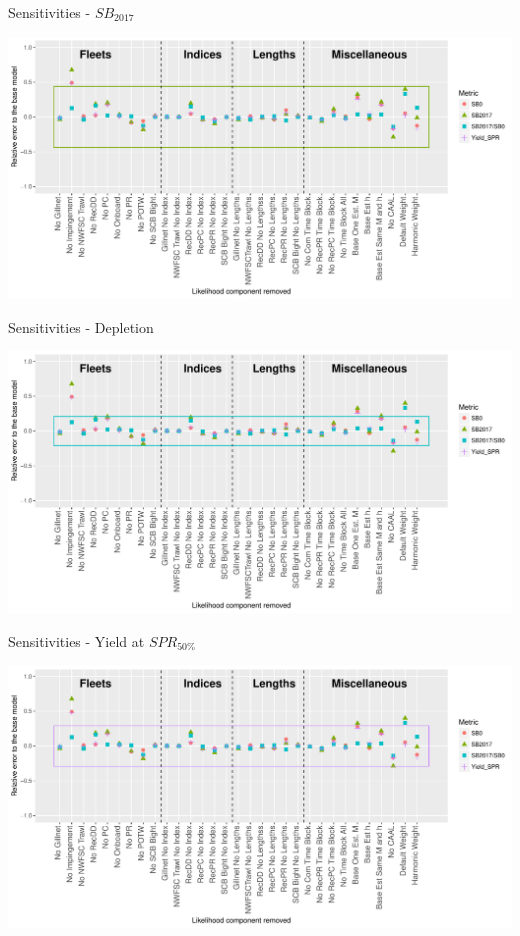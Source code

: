 \documentclass[ignorenonframetext,]{beamer}
\begin{document}
\begin{frame}{Sensitivities - \(SB_{2017}\)}

\includegraphics{Figures/Sensitivity_SB2017.pdf}

\end{frame}

\begin{frame}{Sensitivities - Depletion}

\includegraphics{Figures/Sensitivity_depl.pdf}

\end{frame}

\begin{frame}{Sensitivities - Yield at \(SPR_{50\%}\)}

\includegraphics{Figures/Sensitivity_Yield.pdf}

\end{frame}
\end{document}
